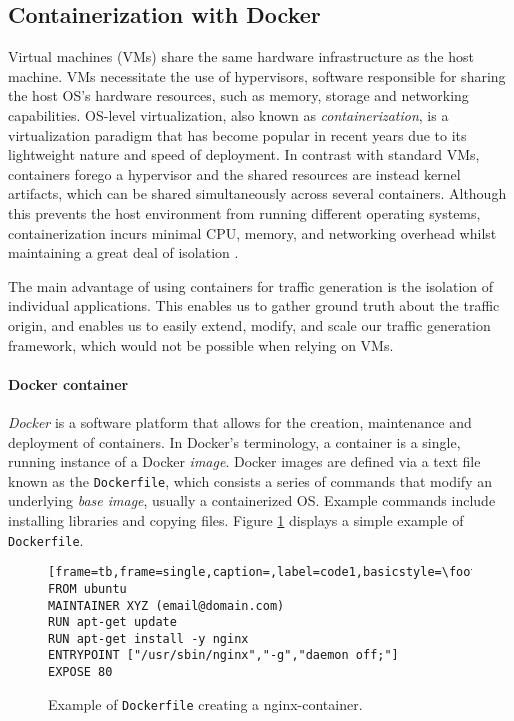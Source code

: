 \subsection{Containerization with Docker}
Virtual machines (VMs) share the same hardware infrastructure as the host machine. VMs necessitate the use of hypervisors, software responsible for sharing the host OS's hardware resources, such as memory, storage and networking capabilities. OS-level virtualization, also known as \textit{containerization}, is a virtualization paradigm that has become popular in recent years due to its lightweight nature and speed of deployment. 
In contrast with standard VMs, containers forego a hypervisor and the shared resources are instead kernel artifacts, which can be shared simultaneously across several containers. Although this prevents the host environment from running different operating systems, containerization incurs minimal CPU, memory, and networking overhead whilst maintaining a great deal of isolation \cite{kolyshkin2006virtualization}. 
 

The main advantage of using containers for traffic generation is the isolation of individual applications. This enables us to gather ground truth about the traffic origin, and enables us to easily extend, modify, and scale our traffic generation framework, which would not be possible when relying on VMs.

 



\paragraph*{Docker container}


\textit{Docker} is a software platform that allows for the creation, maintenance and deployment of containers. In Docker's terminology, a container is a single, running instance of a Docker \textit{image}. Docker images are defined via a text file known as the \texttt{Dockerfile}, which consists a series of commands that modify an underlying \textit{base image}, usually a containerized OS. Example commands include installing libraries and copying files. Figure \ref{fig:dockerfile} displays a simple example of \texttt{Dockerfile}.


\begin{figure}
\begin{lstlisting}[frame=tb,frame=single,caption=,label=code1,basicstyle=\footnotesize]
FROM ubuntu
MAINTAINER XYZ (email@domain.com)
RUN apt-get update
RUN apt-get install -y nginx
ENTRYPOINT ["/usr/sbin/nginx","-g","daemon off;"]
EXPOSE 80
\end{lstlisting}
 \caption{Example of \texttt{Dockerfile} creating a nginx-container.}
 \label{fig:dockerfile}
\end{figure}

